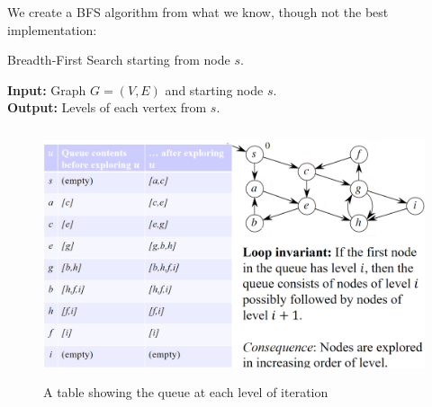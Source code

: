 \noindent
We create a BFS algorithm from what we know, though not the best implementation:
\begin{Func}
    Breadth-First Search starting from node $s$.
    
    \vspace{.5em}
    \noindent
    \textbf{Input:} Graph $G = (V, E)$ and starting node $s$.\\
    \textbf{Output:} Levels of each vertex from $s$.\\
    \begin{algorithm}[H]
        \SetAlgoLined
    \end{algorithm}
\end{Func}
\vspace{-2em}
\begin{figure}[h]
    \begin{center}
      \includegraphics[height=2.9in]{./Sections/graphs/bfs_q.png}
    \end{center}
     \caption{A table showing the queue at each level of iteration}\label{fig:bfs_q}
  \end{figure}

  \newpage

